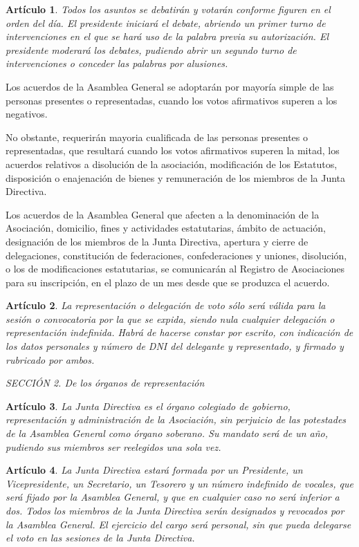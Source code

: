 \documentclass[a4paper,12pt]{article}
\theoremstyle{mystyle}		%
\newtheorem{art}{Artículo}	%
\begin{document}
\begin{onehalfspace}
\begin{art}
Todos los asuntos se debatirán y votarán conforme figuren en el orden del día. El presidente iniciará el debate, abriendo un primer turno de intervenciones en el que se hará uso de la palabra previa su autorización. El presidente moderará los debates, pudiendo abrir un segundo turno de intervenciones o conceder las palabras por alusiones.
\end{art}

Los acuerdos de la Asamblea General se adoptarán por mayoría simple de las personas presentes o representadas, cuando los votos afirmativos superen a los negativos.

No obstante, requerirán mayoria cualificada de las personas presentes o representadas, que resultará cuando los votos afirmativos superen la mitad, los acuerdos relativos a disolución de la asociación, modificación de los Estatutos, disposición o enajenación de bienes y remuneración de los miembros de la Junta Directiva.

Los acuerdos de la Asamblea General que afecten a la denominación de la Asociación, domicilio, fines y actividades estatutarias, ámbito de actuación, designación de los miembros de la Junta Directiva, apertura y cierre de delegaciones, constitución de federaciones, confederaciones y uniones, disolución, o los de modificaciones estatutarias, se comunicarán al Registro de Asociaciones para su inscripción, en el plazo de un mes desde que se produzca el acuerdo.

\begin{art}
La representación o delegación de voto sólo será válida para la sesión o convocatoria por la que se expida, siendo nula cualquier delegación o representación indefinida. Habrá de hacerse constar por escrito, con indicación de los datos personales y número de DNI del delegante y representado, y firmado y rubricado por ambos.
\end{art}

\bigskip

\textit{SECCIÓN 2\textordfeminine. De los órganos de representación}

\begin{art}
La Junta Directiva es el órgano colegiado de gobierno, representación y administración de la Asociación, sin perjuicio de las potestades de la Asamblea General como órgano soberano. Su mandato será de un año, pudiendo sus miembros ser reelegidos una sola vez.
\end{art}

\begin{art}
La Junta Directiva estará formada por un Presidente, un Vicepresidente, un Secretario, un Tesorero y un número indefinido de vocales, que será fijado por la Asamblea General, y que en cualquier caso no será inferior a dos. Todos los miembros de la Junta Directiva serán designados y revocados por la Asamblea General. El ejercicio del cargo será personal, sin que pueda delegarse el voto en las sesiones de la Junta Directiva.
\end{art}


\end{onehalfspace}
\end{document}
